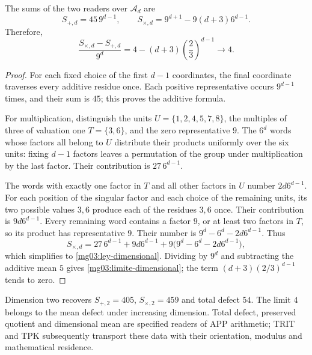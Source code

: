 \begin{proposition}
The sums of the two readers over \(\mathcal A_d\) are
\begin{equation}
 S_{+,d}=45\,9^{d-1},\qquad
 S_{\times,d}=9^{d+1}-9(d+3)6^{d-1}.
 \label{mg03:ley-dimensional}
\end{equation}
Therefore,
\begin{equation}
 \frac{S_{\times,d}-S_{+,d}}{9^d}
 =4-(d+3)\left(\frac23\right)^{d-1}
 \longrightarrow4.
 \label{mg03:limite-dimensional}
\end{equation}
\end{proposition}

\begin{proof}
For each fixed choice of the first \(d-1\) coordinates, the final
coordinate traverses every additive residue once. Each positive
representative occurs \(9^{d-1}\) times, and their sum is \(45\);
this proves the additive formula.

For multiplication, distinguish the units \(U=\{1,2,4,5,7,8\}\),
the multiples of three of valuation one \(T=\{3,6\}\), and the
zero representative \(9\). The \(6^d\) words whose factors all
belong to \(U\) distribute their products uniformly over the six
units: fixing \(d-1\) factors leaves a permutation of the group
under multiplication by the last factor. Their contribution is
\(27\,6^{d-1}\).

The words with exactly one factor in \(T\) and all other factors
in \(U\) number \(2d6^{d-1}\). For each position of the singular
factor and each choice of the remaining units, its two possible values
\(3,6\) produce each of the residues \(3,6\) once. Their contribution
is \(9d6^{d-1}\). Every remaining word contains a factor \(9\),
or at least two factors in \(T\), so its product has representative
\(9\). Their number is \(9^d-6^d-2d6^{d-1}\). Thus
\[
 S_{\times,d}=27\,6^{d-1}+9d6^{d-1}
 +9\bigl(9^d-6^d-2d6^{d-1}\bigr),
\]
which simplifies to \eqref{mg03:ley-dimensional}. Dividing by
\(9^d\) and subtracting the additive mean \(5\) gives
\eqref{mg03:limite-dimensional}; the term
\((d+3)(2/3)^{d-1}\) tends to zero.
\end{proof}

Dimension two recovers \(S_{+,2}=405\), \(S_{\times,2}=459\)
and total defect \(54\). The limit \(4\) belongs to the mean
defect under increasing dimension. Total defect, preserved quotient
and dimensional mean are specified readers of APP arithmetic; TRIT
and TPK subsequently transport these data with their orientation,
modulus and mathematical residence.
